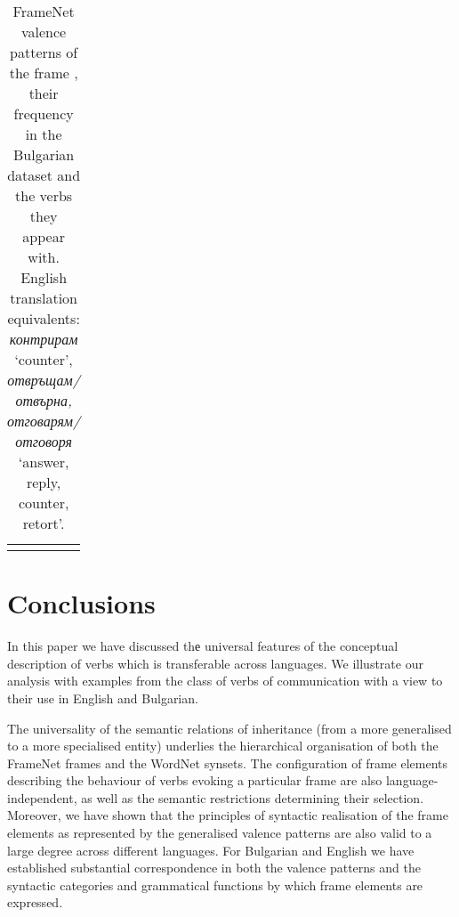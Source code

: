 \documentclass[output=paper,colorlinks,citecolor=brown]{langscibook}
\begin{document}
\begin{table}
\begin{tabularx}{\textwidth}{ lrQ }

\lspbottomrule
\end{tabularx}
\caption{FrameNet valence patterns of the frame , their frequency in the Bulgarian dataset and the verbs they appear with.
English translation equivalents: \textit{контрирам} `counter', \textit{отвръщам\slash отвърна, отговарям\slash отговоря} `answer, reply, counter, retort'.}
\label{tbl:response-valence-bg}
\end{table} 




\section{Conclusions}\label{sec:conclusion}

In this paper we have discussed thе universal features of the conceptual description of verbs which is transferable across languages. We illustrate our analysis with examples from the class of verbs of communication with a view to their use in English and Bulgarian.


The universality of the semantic relations of inheritance (from a more generalised to a more specialised entity) underlies the hierarchical organisation of both the FrameNet frames and the WordNet synsets. The configuration of frame elements describing the behaviour of verbs evoking a particular frame are also language-independent, as well as the semantic restrictions determining their selection. Moreover, we have shown that the principles of syntactic realisation of the frame elements as represented by the generalised valence patterns are also valid to a large degree across different languages. For Bulgarian and English we have established substantial correspondence in both the valence patterns and the syntactic categories and grammatical functions by which frame elements are expressed.
\end{document}
